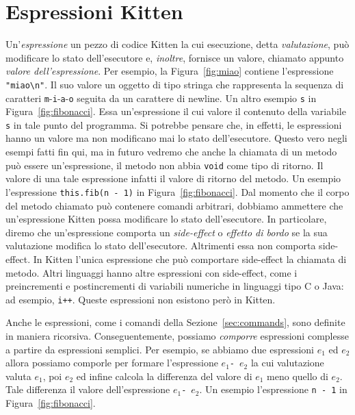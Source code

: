 \section{Espressioni Kitten}\label{sec:expressions}
%
Un'\emph{espressione} \e un pezzo di codice Kitten la cui esecuzione,
detta \emph{valutazione},
pu\`o modificare lo stato dell'esecutore e, \emph{inoltre}, fornisce un
valore, chiamato appunto \emph{valore dell'espressione}. Per esempio, la
Figura~\ref{fig:miao} contiene l'espressione \verb|"miao\n"|. Il suo
valore \e un oggetto di tipo stringa che rappresenta la sequenza di
caratteri \texttt{m}-\texttt{i}-\texttt{a}-\texttt{o} seguita da un
carattere di newline. Un altro esempio \e \texttt{s} in
Figura~\ref{fig:fibonacci}.
Essa \e un'espressione il cui valore \e il contenuto della variabile
\texttt{s} in tale punto del programma.
Si potrebbe pensare che, in effetti, le espressioni
hanno un valore ma non modificano mai lo stato dell'esecutore.
Questo \e vero negli esempi fatti fin qui, ma in futuro vedremo
che anche la chiamata di un metodo pu\`o essere un'espressione, \purche
il metodo non abbia \texttt{void} come tipo di ritorno.
Il valore di una tale espressione \e infatti
il valore di ritorno del metodo. Un esempio \e l'espressione
\texttt{this.fib(n - 1)} in Figura~\ref{fig:fibonacci}. Dal momento che
il corpo del metodo chiamato pu\`o contenere comandi arbitrari,
dobbiamo ammettere che un'espressione Kitten possa modificare lo stato
dell'esecutore. In particolare, diremo che un'espressione comporta
un \emph{side-effect} o \emph{effetto di bordo} se la sua valutazione
modifica lo stato dell'esecutore. Altrimenti essa non comporta side-effect.
In Kitten l'unica espressione che pu\`o comportare side-effect \e la chiamata
di metodo. Altri linguaggi hanno altre espressioni con side-effect, come
i preincrementi e postincrementi di variabili numeriche in
linguaggi tipo C o Java: ad esempio, \texttt{i++}. Queste espressioni non esistono per\`o
in Kitten.

Anche le espressioni, come i comandi della Sezione~\ref{sec:commands},
sono definite in maniera ricorsiva. Conseguentemente, possiamo \emph{comporre}
espressioni complesse a partire da espressioni \piu semplici. Per esempio,
se abbiamo due espressioni $e_1$ ed $e_2$ allora possiamo comporle per
formare l'espressione $e_1$\texttt{-}\ $e_2$ la cui valutazione valuta
$e_1$, poi $e_2$ ed infine calcola la differenza del valore di $e_1$ meno
quello di $e_2$. Tale differenza \e il valore dell'espressione
$e_1$\texttt{-}\ $e_2$.
Un esempio \e l'espressione \texttt{n - 1} in Figura~\ref{fig:fibonacci}.

